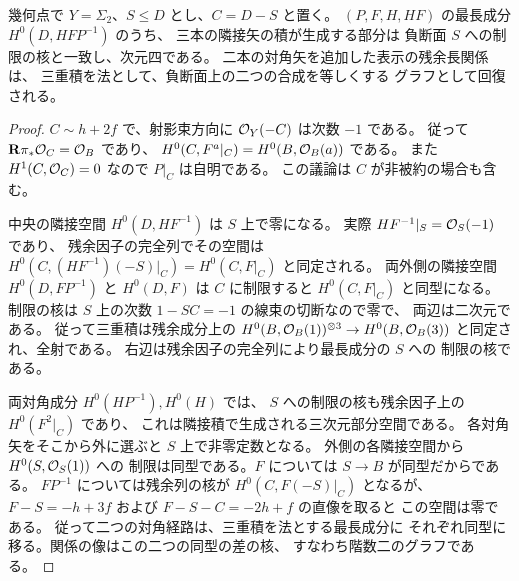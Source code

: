 \begin{proposition}[負断面を含む窓の三重積と長関係]
\label{prop:qa-avatar-deep-triple-product}
幾何点で $Y=\Sigma_2$、$S\leq D$ とし、$C=D-S$ と置く。
$(P,F,H,HF)$ の最長成分 $H^0(D,HFP^{-1})$ のうち、
三本の隣接矢の積が生成する部分は
負断面 $S$ への制限の核と一致し、次元四である。
二本の対角矢を追加した表示の残余長関係は、
三重積を法として、負断面上の二つの合成を等しくする
グラフとして回復される。
\end{proposition}
\begin{proof}
$C\sim h+2f$ で、射影束方向に $\mathcal O_Y(-C)$ は次数 $-1$ である。
従って $\mathbf R\pi_*\mathcal O_C=\mathcal O_B$ であり、
$H^0(C,F^a|_C)=H^0(B,\mathcal O_B(a))$ である。
また $H^1(C,\mathcal O_C)=0$ なので $P|_C$ は自明である。
この議論は $C$ が非被約の場合も含む。

中央の隣接空間 $H^0(D,HF^{-1})$ は $S$ 上で零になる。
実際 $HF^{-1}|_S=\mathcal O_S(-1)$ であり、
残余因子の完全列でその空間は
$H^0(C,(HF^{-1})(-S)|_C)=H^0(C,F|_C)$ と同定される。
両外側の隣接空間 $H^0(D,FP^{-1})$ と $H^0(D,F)$ は
$C$ に制限すると $H^0(C,F|_C)$ と同型になる。
制限の核は $S$ 上の次数 $1-SC=-1$ の線束の切断なので零で、
両辺は二次元である。
従って三重積は残余成分上の
$H^0(B,\mathcal O_B(1))^{\otimes3}\to H^0(B,\mathcal O_B(3))$
と同定され、全射である。
右辺は残余因子の完全列により最長成分の $S$ への
制限の核である。

両対角成分 $H^0(HP^{-1}),H^0(H)$ では、
$S$ への制限の核も残余因子上の $H^0(F^2|_C)$ であり、
これは隣接積で生成される三次元部分空間である。
各対角矢をそこから外に選ぶと $S$ 上で非零定数となる。
外側の各隣接空間から $H^0(S,\mathcal O_S(1))$ への
制限は同型である。$F$ については $S\to B$ が同型だからである。
$FP^{-1}$ については残余列の核が
$H^0(C,F(-S)|_C)$ となるが、
$F-S=-h+3f$ および $F-S-C=-2h+f$ の直像を取ると
この空間は零である。
従って二つの対角経路は、三重積を法とする最長成分に
それぞれ同型に移る。関係の像はこの二つの同型の差の核、
すなわち階数二のグラフである。
\end{proof}

